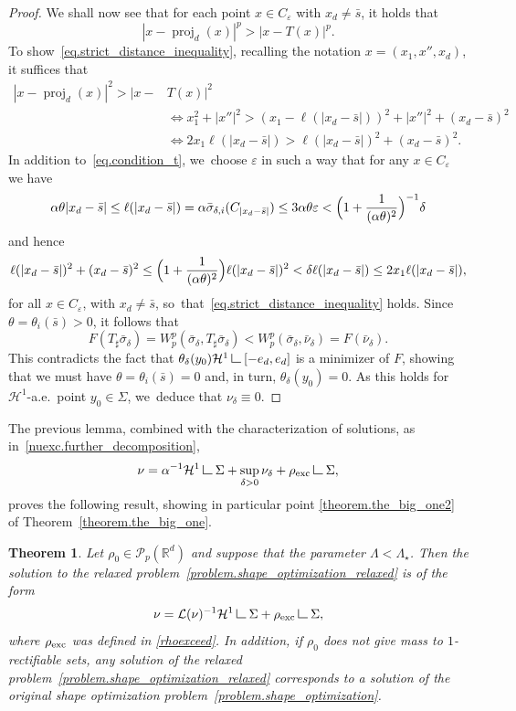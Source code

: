 \documentclass[10pt]{amsart}
\newtheorem{theorem}{Theorem}[section]
\theoremstyle{definition}
\newcommand\LM[1]{\hbox{\vrule width.5pt \vbox to#1pt{\vfill \hrule width#1pt height.5pt}}}
\newcommand\LL{{\mathchoice {\>\LM7\>}{\>\LM7\>}{\,\LM5\,}{\,\LM{3.35}\,}}}
\newcommand{\mres}{\LL}
\newcommand\cH{\mathcal{H}}
\newcommand{\RR}{\mathbb{R}}
\DeclareMathOperator{\proj}{proj}
\newcommand{\rhoexc}{\rho_{\textup{exc}}}
\begin{document}
\begin{proof}
We shall now see that for each point $x \in C_\varepsilon$ with $x_d\neq \bar s$, it holds that
\begin{equation}\label{eq.strict_distance_inequality}
|x - \proj_d(x)|^p > |x - T(x)|^p.
\end{equation}
To show~\eqref{eq.strict_distance_inequality}, recalling the notation $x = (x_1, x'', x_d)$, it suffices that
\begin{align*}
|x - \proj_d(x)|^2 > |x- & T(x)|^2
\\
&\iff
x_1^2 + |x''|^2 >
(x_1-\ell(|x_d-\bar s|))^2+|x''|^2 + (x_d-\bar s)^2\\
&\iff
2x_1\ell(|x_d-\bar s|) > \ell(|x_d-\bar s|)^2 + (x_d-\bar s)^2.
\end{align*}
In addition to~\eqref{eq.condition_t}, we~choose $\varepsilon$ in such a way that for any $x \in C_\varepsilon$ we have
\[ \alpha\theta |x_d-\bar s|
\le
\ell(|x_d-\bar s|) = \alpha \bar \sigma_{\delta, i}(C_{|x_d-\bar s|})
\le 3\alpha\theta\varepsilon < \Bigl(1 +\frac{1}{(\alpha\theta)^2}\Bigr)^{-1}\delta
\]
and hence
\[
\ell(|x_d-\bar s|)^2+(x_d-\bar s)^2 \le
\Bigl(1 + \frac{1}{(\alpha\theta)^2} \Bigr)
\ell(|x_d-\bar s|)^2
< \delta \ell(|x_d-\bar s|)
\le 2x_1 \ell(|x_d-\bar s|),
\]
for all $x \in C_{\varepsilon}$, with $x_d \neq \bar s$, so~that~\eqref{eq.strict_distance_inequality} holds.
Since $\theta=\theta_i(\bar s)>0$, it follows that
\[
F(T_\sharp \bar \sigma_{\delta})=
W_p^p(\bar \sigma_{\delta} , T_\sharp\bar \sigma_{\delta})
<
W_p^p(\bar \sigma_{\delta}, \bar \nu_{\delta})
=
F(\bar \nu_{\delta}).
\]
This contradicts the fact that $\theta_\delta(y_0) \cH^1\mres [-e_d, e_d]$ is a minimizer of $F$, showing that we must have $\theta=\theta_i(\bar s)=0$ and, in turn, $\theta_\delta(y_0)=0$.
As this holds for $\cH^1$-a.e.~point $y_0 \in \Sigma$, we~deduce that $\nu_\delta \equiv 0$.
\end{proof}

The previous lemma, combined with the characterization of solutions, as in~\eqref{nuexc.further_decomposition},
\[
\nu = \alpha^{-1}\cH^1\mres \Sigma + \sup_{\delta > 0}\nu_\delta + \rhoexc\mres \Sigma,
\]
proves the following result, showing in particular point \eqref{theorem.the_big_one2} of Theorem~\ref{theorem.the_big_one}.

\begin{theorem}\label{theorem.inR2_density_is_1}
Let $\rho_0 \in \mathcal{P}_p(\RR^d)$ and suppose that the parameter $\Lambda < \Lambda_\star$. Then the solution to the relaxed problem~\eqref{problem.shape_optimization_relaxed} is of the form
\[
\nu =
\mathcal{L}(\nu)^{-1}\cH^1\mres \Sigma
+
\rhoexc\mres \Sigma,
\]
where $\rhoexc$ was defined in \eqref{rhoexceed}.
In addition, if $\rho_0$ does not give mass to $1$-rectifiable sets, any solution of the relaxed problem~\eqref{problem.shape_optimization_relaxed} corresponds to a solution of the original shape optimization problem~\eqref{problem.shape_optimization}.
\end{theorem}
\end{document}
